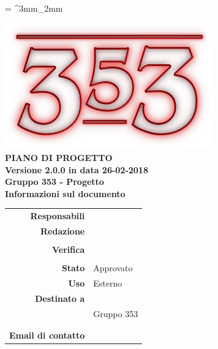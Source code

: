 \documentclass[openany, a4paper, 12pt]{report}
\begin{document}
\tabulinesep = ^3mm_2mm

\begin{titlepage}
	\centering
	\vfill
	{
		\bfseries
		\vskip2cm
		\includegraphics[width=9cm]{../../common/images/logo.png} \\
		\vfill
		\Huge{PIANO DI PROGETTO}\\
		\vfill
		\Large Versione 2.0.0 in data 26-02-2018\\
		\large Gruppo 353 - Progetto \progetto \\
		\vfill
		\normalsize Informazioni sul documento\\
		\begin{table}[htbp]
			\centering
			\renewcommand\arraystretch{1.2}
			\begin{tabular}{r|l}
				\hline
				\textbf{Responsabili}	& \Davide \\
				
				\textbf{Redazione} 		& \Gianluca \\
										& \Valentina \\
										
				\textbf{Verifica} 		& \Parwinder \\
										& \Mirco \\	
				
				\textbf{Stato} 			& Approvato\\
				\textbf{Uso}			& Esterno\\
				\textbf{Destinato a}   	& \Proponente\\
										& Gruppo 353\\
										& \Vardanega\\
										& \Cardin\\
				
				\textbf{Email di contatto}	& \mailgroup
			\end{tabular}
		\end{table}
		\vfill
	}    
\end{titlepage}

\tableofcontents
\listoffigures
\listoftables
\newpage
{}






 

\end{document}
